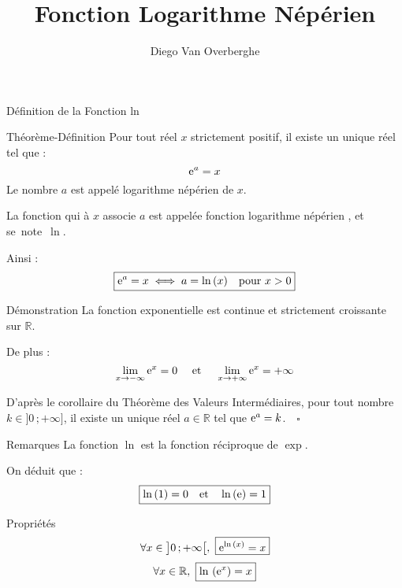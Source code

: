 \documentclass{cours}
\title{Fonction Logarithme Népérien}
\author{Diego Van Overberghe}
\begin{document}

    \begin{Gpartie}{Définition de la Fonction ln}
        \begin{Spartie}{Théorème-Définition}
            Pour tout réel $x$ strictement positif, il existe un unique réel tel que :
            \[\mathrm{e}^a=x\]
            Le nombre $a$ est appelé logarithme népérien de $x$.
            
            La fonction qui à $x$ associe $a$ est appelée \og fonction logarithme népérien \fg{}, et se~note~$\ln$.

            Ainsi :
            \[\boxed{\mathrm{e}^a=x\iff a=\ln\,(x)\quad\text{pour $x>0$}}\]
        \end{Spartie}
        \begin{Spartie}{Démonstration}
            La fonction exponentielle est continue et strictement croissante sur $\mathbb{R}$.

            De plus :
            \[\lim_{x\to -\infty} \mathrm{e}^x=0\quad\text{ et }\quad\lim_{x\to +\infty} \mathrm{e}^x=+\infty\]

            D'après le corollaire du Théorème des Valeurs Intermédiaires, pour tout nombre $k\in\big]0\,;+\infty\big]$, il existe un unique réel $a\in\mathbb{R}$ tel que $\mathrm{e}^a=k$.$\quad\square$
        \end{Spartie}
        \begin{Spartie}{Remarques}
            La fonction $\ln$ est la fonction réciproque de $\exp$.

            On déduit que : \[\boxed{\ln\,(1)=0\quad\text{et}\quad\ln\,(\mathrm{e})=1}\]
        \end{Spartie}
        \begin{Spartie}{Propriétés}
            \[\forall x\in\big]0\,;+\infty\big[,~\boxed{\mathrm{e}^{\ln\,(x)}=x}\]
            \[\forall x\in\mathbb{R},~\boxed{\ln\,\left(\mathrm{e}^x\right)=x}\]
        \end{Spartie}
    \end{Gpartie}
\end{document}
